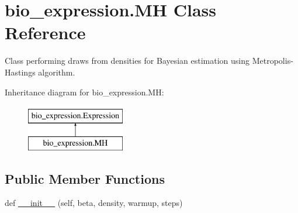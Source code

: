 \hypertarget{classbio__expression_1_1_m_h}{}\section{bio\+\_\+expression.\+MH Class Reference}
\label{classbio__expression_1_1_m_h}


Class performing draws from densities for Bayesian estimation using Metropolis-\/\+Hastings algorithm.  


Inheritance diagram for bio\+\_\+expression.\+MH\+:\begin{figure}[H]
\begin{center}
\leavevmode
\includegraphics[height=2.000000cm]{classbio__expression_1_1_m_h}
\end{center}
\end{figure}
\subsection*{Public Member Functions}
\begin{DoxyCompactItemize}
\item 
def \hyperlink{classbio__expression_1_1_m_h_a3508f4e451a572c9dcdd891060bb30a7}{\+\_\+\+\_\+init\+\_\+\+\_\+} (self, beta, density, warmup, steps)
\end{DoxyCompactItemize}
